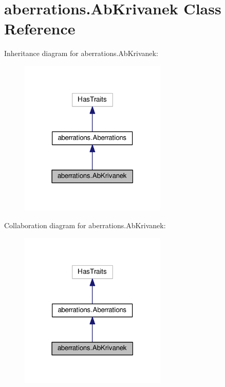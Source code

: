\hypertarget{classaberrations_1_1_ab_krivanek}{\section{aberrations.\-Ab\-Krivanek Class Reference}
\label{classaberrations_1_1_ab_krivanek}
}


Inheritance diagram for aberrations.\-Ab\-Krivanek\-:
\nopagebreak
\begin{figure}[H]
\begin{center}
\leavevmode
\includegraphics[width=198pt]{classaberrations_1_1_ab_krivanek__inherit__graph}
\end{center}
\end{figure}


Collaboration diagram for aberrations.\-Ab\-Krivanek\-:
\nopagebreak
\begin{figure}[H]
\begin{center}
\leavevmode
\includegraphics[width=198pt]{classaberrations_1_1_ab_krivanek__coll__graph}
\end{center}
\end{figure}
